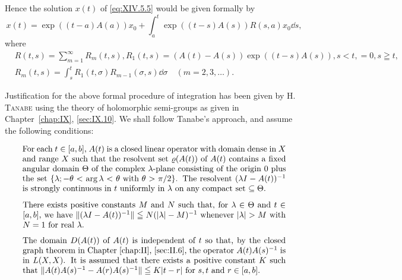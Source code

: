 Hence the solution $x(t)$ of \eqref{eq:XIV.5.5} would be given formally by 
\begin{equation}\label{eq:XIV.5.6}
x (t) = \exp ((t - a) A (a)) x _{0} + \int_{a} ^{t} \exp ((t - s) A (s)) R (s, a) x _{0} \dd s,
\end{equation}
where 
\begin{equation}\label{eq:XIV.5.7}
\begin{aligned}
&R (t, s) = \sum\limits_{m=1} ^{\infty} R _{m} (t, s), R _{1} (t, s) = (A (t) - A (s)) \exp ((t - s) A (s)), s < t, = 0, s \geqq t,
\\
&R _{m} (t, s) = \int_{s} ^{t} R _{1} (t, \sigma) R _{m-1} (\sigma , s) \dd \sigma \quad (m = 2, 3, \dots).
\end{aligned}
\end{equation}

Justification for the above formal procedure of integration has been given by H. \textsc{Tanabe} \cite{tanabe315} using the theory of holomorphic semi-groups as given in Chapter~\ref{chap:IX}, \ref{sec:IX.10}. We shall follow Tanabe's approach, and assume the following conditions: 

\begin{equation}\label{eq:XIV.5.8}
\parbox{0.92\linewidth}{\everymath{}\let\limits\nolimits For each $t \in [a, b]$, $A(t)$ is a closed linear operator with domain dense in $X$ and range $X$ such that the resolvent set $\varrho(A(t))$ of $A(t)$ contains a fixed angular domain $\Theta$ of the complex $\lambda$-plane consisting of the origin $0$ plus the set $\{\lambda; -\theta < \arg \lambda < \theta \text{ with } \theta > \pi/2\}$. The resolvent $(\lambda I - A(t))^{-1}$ is strongly continuous in $t$ uniformly in $\lambda$ on any compact set $\subseteq \Theta$.}
\end{equation}

\begin{equation}\label{eq:XIV.5.9}
\parbox{0.92\linewidth}{\everymath{}\let\limits\nolimits There exists positive constants $M$ and $N$ such that, for $\lambda \in \Theta$ and $t \in [a, b]$, we have $\|(\lambda I - A(t))^{-1}\| \leqq N(|\lambda| - M)^{-1}$ whenever $|\lambda| > M$ with $N = 1$ for real $\lambda$.}
\end{equation}

\begin{equation}\label{eq:XIV.5.10}
\parbox{0.92\linewidth}{\everymath{}\let\limits\nolimits The domain $D(A(t))$ of $A(t)$ is independent of $t$ so that, by the closed graph theorem in Chapter~\ref{chap:II}, \ref{sec:II.6}, the operator $A(t)A(s)^{-1}$ is in $L(X,X)$. It is assumed that there exists a positive constant $K$ such that $\|A(t)A(s)^{-1} - A(r)A(s)^{-1}\| \leqq K|t - r|$ for $s, t$ and $r \in [a,b]$.}
\end{equation}



